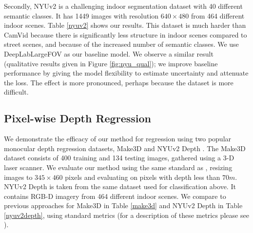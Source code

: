 \documentclass{article}
\begin{document}
Secondly, NYUv2 \cite{silberman2012indoor} is a challenging indoor segmentation dataset with 40 different semantic classes. It has 1449 images with resolution $640\times480$ from 464 different indoor scenes. Table \ref{nyuv2} shows our results. This dataset is much harder than CamVid because there is significantly less structure in indoor scenes compared to street scenes, and because of the increased number of semantic classes. We use DeepLabLargeFOV \cite{chen2014semantic} as our baseline model. We observe a similar result (qualitative results given in Figure \ref{fig:nyu_qual}); we improve baseline performance by giving the model flexibility to estimate uncertainty and attenuate the loss. The effect is more pronounced, perhaps because the dataset is more difficult.



\subsection{Pixel-wise Depth Regression}

We demonstrate the efficacy of our method for regression using two popular monocular depth regression datasets, Make3D \cite{saxena2009make3d} and NYUv2 Depth \cite{silberman2012indoor}. The Make3D dataset consists of 400 training and 134 testing images, gathered using a 3-D laser scanner. We evaluate our method using the same standard as \cite{laina2016deeper}, resizing images to $345\times460$ pixels and evaluating on pixels with depth less than $70m$. NYUv2 Depth is taken from the same dataset used for classification above. It contains RGB-D imagery from 464 different indoor scenes. We compare to previous approaches for Make3D in Table \ref{make3d} and NYUv2 Depth in Table \ref{nyuv2depth}, using standard metrics (for a description of these metrics please see \cite{eigen2014depth}).
\end{document}
